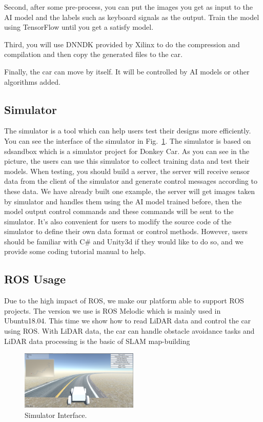 \documentclass[conference]{IEEEtran}
\begin{document}
Second, after some pre-process, you can put the images you get as input to the AI model and the labels such as keyboard signals as the output. Train the model using TensorFlow until you get a satisfy model.

Third, you will use DNNDK\cite{b17} provided by Xilinx to do the compression and compilation and then copy the generated files to the car.

Finally, the car can move by itself. It will be controlled by AI models or other algorithms added. 

\subsection{Simulator}
The simulator is a tool which can help users test their designs more efficiently. You can see the interface of the simulator in Fig.~\ref{si}. The simulator is based on sdsandbox\cite{b5} which is a simulator project for Donkey Car\cite{b34}. As you can see in the picture, the users can use this simulator to collect training data and test their models. 
When testing, you should build a server, the server will receive sensor data from the client of the simulator and generate control messages according to these data. We have already built one example, the server will get images taken by simulator and handles them using the AI model trained before, then the model output control commands and these commands will be sent to the simulator.
It's also convenient for users to modify the source code of the simulator to define their own data format or control methods. However, users should be familiar with C\# and Unity3d if they would like to do so, and we provide some coding tutorial manual to help.

\subsection{ROS Usage}
Due to the high impact of ROS, we make our platform able to support ROS projects. The version we use is ROS Melodic\cite{b35} which is mainly used in Ubuntu18.04. 
This time we show how to read LiDAR data and control the car using ROS. With LiDAR data, the car can handle obstacle avoidance tasks and LiDAR data processing is the basic of SLAM map-building

\begin{figure}[htbp]
\centerline{\includegraphics[width=0.5\textwidth]{simulator.png}}
\caption{Simulator Interface.}
\label{si}
\end{figure}
\end{document}
